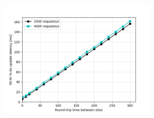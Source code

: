 \begin{figure}
\centering
  \includegraphics[width=0.7\textwidth]{./figures/evaluation/fr_latency_net_latency.png}
  \caption{}
  \label{fig:fr_latency_net_latency}
\end{figure}

